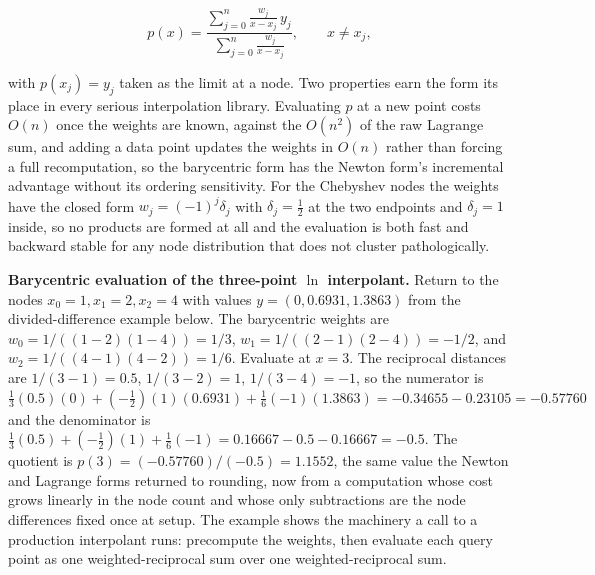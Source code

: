 \[
p(x) = \frac{\displaystyle\sum_{j=0}^{n} \frac{w_{j}}{x - x_{j}}\, y_{j}}
{\displaystyle\sum_{j=0}^{n} \frac{w_{j}}{x - x_{j}}},
\qquad x \neq x_{j},
\]

with $p(x_{j}) = y_{j}$ taken as the limit at a node. Two properties earn the
form its place in every serious interpolation library. Evaluating $p$ at a new
point costs $O(n)$ once the weights are known, against the $O(n^{2})$ of the
raw Lagrange sum, and adding a data point updates the weights in $O(n)$ rather
than forcing a full recomputation, so the barycentric form has the Newton
form's incremental advantage without its ordering sensitivity. For the
Chebyshev nodes the weights have the closed form $w_{j} = (-1)^{j}\delta_{j}$
with $\delta_{j} = \tfrac{1}{2}$ at the two endpoints and $\delta_{j} = 1$
inside, so no products are formed at all and the evaluation is both fast and
backward stable for any node distribution that does not cluster
pathologically.

\begin{example}
\textbf{Barycentric evaluation of the three-point $\ln$ interpolant.} Return
to the nodes $x_{0} = 1, x_{1} = 2, x_{2} = 4$ with values $y = (0, 0.6931,
1.3863)$ from the divided-difference example below. The barycentric weights
are $w_{0} = 1/((1-2)(1-4)) = 1/3$, $w_{1} = 1/((2-1)(2-4)) = -1/2$, and
$w_{2} = 1/((4-1)(4-2)) = 1/6$. Evaluate at $x = 3$. The reciprocal distances
are $1/(3-1) = 0.5$, $1/(3-2) = 1$, $1/(3-4) = -1$, so the numerator is
$\tfrac{1}{3}(0.5)(0) + (-\tfrac{1}{2})(1)(0.6931) + \tfrac{1}{6}(-1)(1.3863)
= -0.34655 - 0.23105 = -0.57760$ and the denominator is $\tfrac{1}{3}(0.5) +
(-\tfrac{1}{2})(1) + \tfrac{1}{6}(-1) = 0.16667 - 0.5 - 0.16667 = -0.5$. The
quotient is $p(3) = (-0.57760)/(-0.5) = 1.1552$, the same value the Newton and
Lagrange forms returned to rounding, now from a computation whose cost grows
linearly in the node count and whose only subtractions are the node
differences fixed once at setup. The example shows the machinery a call to a
production interpolant runs: precompute the weights, then evaluate each query
point as one weighted-reciprocal sum over one weighted-reciprocal sum.
\end{example}

